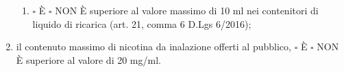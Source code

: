 \documentclass[12pt]{article}
\begin{document}
\begin{enumerate}
\begin{enumerate}
        \item \begin{math}\square\end{math} È \begin{math}\square\end{math} NON È superiore al valore massimo di 10 ml nei contenitori di liquido di ricarica (art. 21, comma 6 D.Lgs 6/2016);
    \end{enumerate}

    \item il contenuto massimo di nicotina da inalazione offerti al pubblico, \begin{math}\square\end{math} È \begin{math}\square\end{math} NON È superiore al valore di 20 mg/ml.
\end{enumerate}
\end{document}

